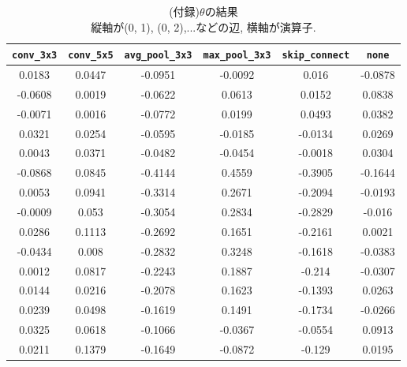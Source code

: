 \documentclass[twocolumn]{jarticle}     %
\begin{document}
\begin{table}[tb]
  \begin{center}
    \caption{(付録)$\theta$の結果\\
      縦軸が(0, 1), (0, 2),...などの辺, 横軸が演算子.}
    \begin{tabular}{|c|c|c|c|c|c|} \hline
      \verb|conv_3x3| & \verb|conv_5x5| & \verb|avg_pool_3x3| & \verb|max_pool_3x3| & \verb|skip_connect| & \verb|none| \\ \hline
      0.0183 & 0.0447 & -0.0951 & -0.0092 & 0.016 & -0.0878 \\ \hline
      -0.0608 & 0.0019 & -0.0622 & 0.0613 & 0.0152 & 0.0838 \\ \hline
      -0.0071 & 0.0016 & -0.0772 & 0.0199 & 0.0493 & 0.0382 \\ \hline
      0.0321 & 0.0254 & -0.0595 & -0.0185 & -0.0134 & 0.0269 \\ \hline
      0.0043 & 0.0371 & -0.0482 & -0.0454 & -0.0018 & 0.0304 \\ \hline
      -0.0868 & 0.0845 & -0.4144 & 0.4559 & -0.3905 & -0.1644 \\ \hline
      0.0053 & 0.0941 & -0.3314 & 0.2671 & -0.2094 & -0.0193 \\ \hline
      -0.0009 & 0.053 & -0.3054 & 0.2834 & -0.2829 & -0.016 \\ \hline
      0.0286 & 0.1113 & -0.2692 & 0.1651 & -0.2161 & 0.0021 \\ \hline
      -0.0434 & 0.008 & -0.2832 & 0.3248 & -0.1618 & -0.0383 \\ \hline
      0.0012 & 0.0817 & -0.2243 & 0.1887 & -0.214 & -0.0307 \\ \hline
      0.0144 & 0.0216 & -0.2078 & 0.1623 & -0.1393 & 0.0263 \\ \hline
      0.0239 & 0.0498 & -0.1619 & 0.1491 & -0.1734 & -0.0266 \\ \hline
      0.0325 & 0.0618 & -0.1066 & -0.0367 & -0.0554 & 0.0913 \\ \hline
      0.0211 & 0.1379 & -0.1649 & -0.0872 & -0.129 & 0.0195 \\ \hline
    \end{tabular}
    \label{tab:theta}
  \end{center}
\end{table}



\end{document}
